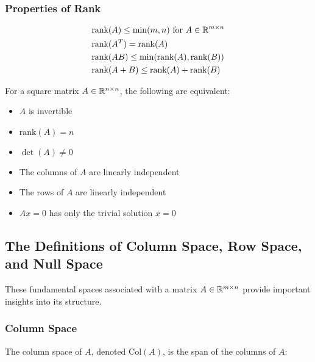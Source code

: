 \subsubsection{Properties of Rank}

\begin{align*}
    &\text{rank}(A) \leq \min(m,n) \text{ for } A \in \mathbb{R}^{m \times n} \\
    &\text{rank}(A^T) = \text{rank}(A) \\
    &\text{rank}(AB) \leq \min(\text{rank}(A), \text{rank}(B)) \\
    &\text{rank}(A+B) \leq \text{rank}(A) + \text{rank}(B)
\end{align*}

For a square matrix \(A \in \mathbb{R}^{n \times n}\), the following are equivalent:

\begin{itemize}

    \item \(A\) is invertible

    \item \(\text{rank}(A) = n\)

    \item \(\det(A) \neq 0\)

    \item The columns of \(A\) are linearly independent

    \item The rows of \(A\) are linearly independent

    \item \(Ax = 0\) has only the trivial solution \(x = 0\)

\end{itemize}

\subsection{The Definitions of Column Space, Row Space, and Null Space}

These fundamental spaces associated with a matrix \(A \in \mathbb{R}^{m \times n}\) provide important insights into its structure.

\subsubsection{Column Space}

The column space of \(A\), denoted \(\text{Col}(A)\), is the span of the columns of \(A\):

